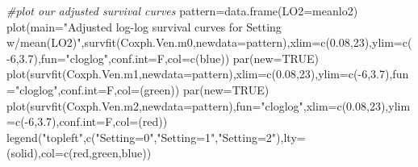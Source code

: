 \documentclass[
]{article}
\newenvironment{Shaded}{\begin{snugshade}}{\end{snugshade}}
\newcommand{\AttributeTok}[1]{\textcolor[rgb]{0.77,0.63,0.00}{#1}}
\newcommand{\CommentTok}[1]{\textcolor[rgb]{0.56,0.35,0.01}{\textit{#1}}}
\newcommand{\ConstantTok}[1]{\textcolor[rgb]{0.00,0.00,0.00}{#1}}
\newcommand{\DecValTok}[1]{\textcolor[rgb]{0.00,0.00,0.81}{#1}}
\newcommand{\FloatTok}[1]{\textcolor[rgb]{0.00,0.00,0.81}{#1}}
\newcommand{\FunctionTok}[1]{\textcolor[rgb]{0.00,0.00,0.00}{#1}}
\newcommand{\NormalTok}[1]{#1}
\newcommand{\OtherTok}[1]{\textcolor[rgb]{0.56,0.35,0.01}{#1}}
\newcommand{\SpecialCharTok}[1]{\textcolor[rgb]{0.00,0.00,0.00}{#1}}
\newcommand{\StringTok}[1]{\textcolor[rgb]{0.31,0.60,0.02}{#1}}
\begin{document}
\begin{Shaded}
\begin{Highlighting}[]
\CommentTok{\#plot our adjusted survival curves }
\NormalTok{pattern}\OtherTok{=}\FunctionTok{data.frame}\NormalTok{(}\AttributeTok{LO2=}\NormalTok{meanlo2)}
\FunctionTok{plot}\NormalTok{(}\AttributeTok{main=}\StringTok{"Adjusted log{-}log survival curves for Setting w/mean(LO2)"}\NormalTok{,}\FunctionTok{survfit}\NormalTok{(Coxph.Ven.m0,}\AttributeTok{newdata=}\NormalTok{pattern),}\AttributeTok{xlim=}\FunctionTok{c}\NormalTok{(}\FloatTok{0.08}\NormalTok{,}\DecValTok{23}\NormalTok{),}\AttributeTok{ylim=}\FunctionTok{c}\NormalTok{(}\SpecialCharTok{{-}}\DecValTok{6}\NormalTok{,}\FloatTok{3.7}\NormalTok{),}\AttributeTok{fun=}\StringTok{"cloglog"}\NormalTok{,}\AttributeTok{conf.int=}\NormalTok{F,}\AttributeTok{col=}\FunctionTok{c}\NormalTok{(}\StringTok{\textquotesingle{}blue\textquotesingle{}}\NormalTok{))}
\FunctionTok{par}\NormalTok{(}\AttributeTok{new=}\ConstantTok{TRUE}\NormalTok{)}
\FunctionTok{plot}\NormalTok{(}\FunctionTok{survfit}\NormalTok{(Coxph.Ven.m1,}\AttributeTok{newdata=}\NormalTok{pattern),}\AttributeTok{xlim=}\FunctionTok{c}\NormalTok{(}\FloatTok{0.08}\NormalTok{,}\DecValTok{23}\NormalTok{),}\AttributeTok{ylim=}\FunctionTok{c}\NormalTok{(}\SpecialCharTok{{-}}\DecValTok{6}\NormalTok{,}\FloatTok{3.7}\NormalTok{),}\AttributeTok{fun=}\StringTok{"cloglog"}\NormalTok{,}\AttributeTok{conf.int=}\NormalTok{F,}\AttributeTok{col=}\NormalTok{(}\StringTok{\textquotesingle{}green\textquotesingle{}}\NormalTok{))}
\FunctionTok{par}\NormalTok{(}\AttributeTok{new=}\ConstantTok{TRUE}\NormalTok{)}
\FunctionTok{plot}\NormalTok{(}\FunctionTok{survfit}\NormalTok{(Coxph.Ven.m2,}\AttributeTok{newdata=}\NormalTok{pattern),}\AttributeTok{fun=}\StringTok{"cloglog"}\NormalTok{,}\AttributeTok{xlim=}\FunctionTok{c}\NormalTok{(}\FloatTok{0.08}\NormalTok{,}\DecValTok{23}\NormalTok{),}\AttributeTok{ylim=}\FunctionTok{c}\NormalTok{(}\SpecialCharTok{{-}}\DecValTok{6}\NormalTok{,}\FloatTok{3.7}\NormalTok{),}\AttributeTok{conf.int=}\NormalTok{F,}\AttributeTok{col=}\NormalTok{(}\StringTok{\textquotesingle{}red\textquotesingle{}}\NormalTok{))}
\FunctionTok{legend}\NormalTok{(}\StringTok{"topleft"}\NormalTok{,}\FunctionTok{c}\NormalTok{(}\StringTok{"Setting=0"}\NormalTok{,}\StringTok{"Setting=1"}\NormalTok{,}\StringTok{"Setting=2"}\NormalTok{),}\AttributeTok{lty=}\NormalTok{(}\StringTok{\textquotesingle{}solid\textquotesingle{}}\NormalTok{),}\AttributeTok{col=}\FunctionTok{c}\NormalTok{(}\StringTok{\textquotesingle{}red\textquotesingle{}}\NormalTok{,}\StringTok{\textquotesingle{}green\textquotesingle{}}\NormalTok{,}\StringTok{\textquotesingle{}blue\textquotesingle{}}\NormalTok{))}
\end{Highlighting}
\end{Shaded}
\end{document}
